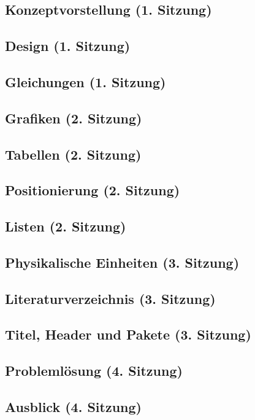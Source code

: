 \documentclass{subfiles}
\begin{document}
    \subsection{Konzeptvorstellung (1. Sitzung)}
        

    \subsection{Design (1. Sitzung)}
        

    \subsection{Gleichungen (1. Sitzung)}
        

    \subsection{Grafiken (2. Sitzung)}
        

    \subsection{Tabellen (2. Sitzung)}
        

    \subsection{Positionierung (2. Sitzung)}
        

    \subsection{Listen (2. Sitzung)}
        

    \subsection{Physikalische Einheiten (3. Sitzung)}
        

    \subsection{Literaturverzeichnis (3. Sitzung)}
        

    \subsection{Titel, Header und Pakete (3. Sitzung)}
        

    \subsection{Problemlösung (4. Sitzung)}
        
    
    \subsection{Ausblick (4. Sitzung)}
        
\end{document}
